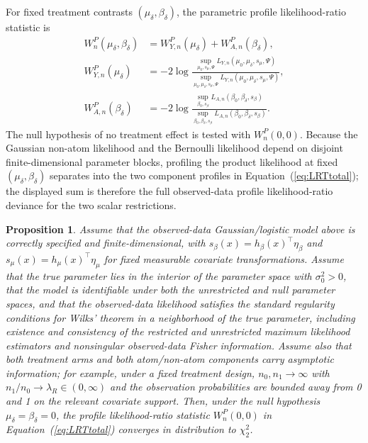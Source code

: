 \documentclass[11pt]{article}
\newtheorem{proposition}{Proposition}
\begin{document}
For fixed treatment contrasts $(\mu_\delta,\beta_\delta)$, the parametric profile likelihood-ratio statistic is
\begin{equation}
\label{eq:LRTtotal}
\begin{aligned}
  W_n^P(\mu_\delta, \beta_\delta)
  &= W_{Y,n}^P(\mu_\delta) + W_{A,n}^P(\beta_\delta),\\
  W_{Y,n}^P(\mu_\delta)
  &= -2\log \frac{\sup\limits_{\mu_0, s_\mu, \Psi} L_{Y,n}(\mu_0, \mu_\delta, s_\mu, \Psi)}
  {\sup\limits_{\mu_0, \mu_\delta, s_\mu, \Psi} L_{Y,n}(\mu_0, \mu_\delta, s_\mu, \Psi)},\\
  W_{A,n}^P(\beta_\delta)
  &= -2\log \frac{\sup\limits_{\beta_0, s_\beta} L_{A,n}(\beta_0, \beta_\delta, s_\beta)}
  {\sup\limits_{\beta_0, \beta_\delta, s_\beta} L_{A,n}(\beta_0, \beta_\delta, s_\beta)}.
\end{aligned}
\end{equation}
The null hypothesis of no treatment effect is tested with $W_n^P(0,0)$.
Because the Gaussian non-atom likelihood and the Bernoulli likelihood depend on disjoint finite-dimensional parameter blocks, profiling the product likelihood at fixed $(\mu_\delta,\beta_\delta)$ separates into the two component profiles in Equation~(\ref{eq:LRTtotal}); the displayed sum is therefore the full observed-data profile likelihood-ratio deviance for the two scalar restrictions.

\begin{proposition}
Assume that the observed-data Gaussian/logistic model above is correctly specified and finite-dimensional, with $s_\beta(x)=h_\beta(x)^\top\eta_\beta$ and $s_\mu(x)=h_\mu(x)^\top\eta_\mu$ for fixed measurable covariate transformations. Assume that the true parameter lies in the interior of the parameter space with $\sigma_0^2>0$, that the model is identifiable under both the unrestricted and null parameter spaces, and that the observed-data likelihood satisfies the standard regularity conditions for Wilks' theorem in a neighborhood of the true parameter, including existence and consistency of the restricted and unrestricted maximum likelihood estimators and nonsingular observed-data Fisher information. Assume also that both treatment arms and both atom/non-atom components carry asymptotic information; for example, under a fixed treatment design, $n_0,n_1\to\infty$ with $n_1/n_0\to\lambda_R\in(0,\infty)$ and the observation probabilities are bounded away from 0 and 1 on the relevant covariate support. Then, under the null hypothesis $\mu_\delta = \beta_\delta = 0$, the profile likelihood-ratio statistic $W_n^P(0,0)$ in Equation~(\ref{eq:LRTtotal}) converges in distribution to $\chi^2_2$.
\end{proposition}
\end{document}
